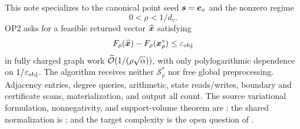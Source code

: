 This note specializes to the canonical point seed $\bm{s}=\bm{e}_{v}$ and the
nonzero regime
\begin{equation}
 0<\rho<1/d_v.
 \label{eq:nonzero-regime}
\end{equation}
OP2 asks for a feasible returned vector $\widehat{\bm{x}}$ satisfying
\begin{equation}
 F_\rho(\widehat{\bm{x}})-F_\rho(\bm{x}_\rho^*)\leq\varepsilon_{\mathrm{obj}}
 \label{eq:op2-gap}
\end{equation}
in fully charged graph work
$\widetilde{\mathcal{O}}(1/(\rho\sqrt\alpha))$, with only polylogarithmic dependence on
$1/\varepsilon_{\mathrm{obj}}$.  The algorithm receives neither $\mathcal S_\rho^*$ nor free global
preprocessing.  Adjacency entries, degree queries, arithmetic, state
reads/writes, boundary and certificate scans, materialization, and output all
count.
The source variational formulation, nonnegativity, and support-volume theorem
are \citet[Section~4 and Theorems~1--2]{fountoulakis2019variational}; the
shared normalization is \citet[Section~3]{fountoulakis2026complexity}; and the
target complexity is the open question of
\citet[Section~3]{fountoulakis2022open}.

